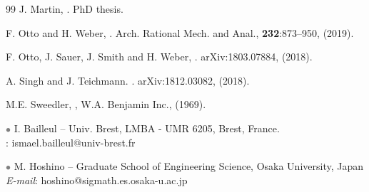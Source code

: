 \documentclass[10pt, reqno]{amsart}
\numberwithin{subsection}{section}
\numberwithin{subsubsection}{subsection}
\numberwithin{equation}{section} %
\theoremstyle{mystyle}
\theoremstyle{mystyle2}
\theoremstyle{mystyle3}
\begin{document}
\begin{thebibliography}{99}
J. Martin,
.
\newblock PhD thesis. 

F. Otto and H. Weber,
.
\newblock Arch. Rational Mech. and Anal., {\bf 232}:873--950, (2019).

F. Otto, J. Sauer, J. Smith and H. Weber,
.
\newblock arXiv:1803.07884, (2018).

A. Singh and J. Teichmann.
.
\newblock arXiv:1812.03082, (2018).

M.E. Sweedler,
,
\newblock W.A. Benjamin Inc., (1969).

\end{thebibliography}


\medskip


{\small 
\noindent \textcolor{gray}{$\bullet$} {\sf I. Bailleul} -- Univ. Brest, LMBA - UMR 6205, Brest, France.   \\
: ismael.bailleul@univ-brest.fr    

\medskip

\noindent \textcolor{gray}{$\bullet$} {\sf M. Hoshino} --  Graduate School of Engineering Science, Osaka University, Japan   \\
{\it E-mail}: hoshino@sigmath.es.osaka-u.ac.jp   }
\end{document}
